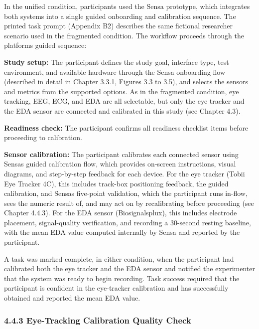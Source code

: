 \documentclass[
]{article}
\begin{document}
In the unified condition, participants used the Sensa prototype, which integrates both systems into a single guided onboarding and calibration sequence. The printed task prompt (Appendix B2) describes the same fictional researcher scenario used in the fragmented condition. The workflow proceeds through the platform\textquotesingle s guided sequence:

\textbf{Study setup:} The participant defines the study goal, interface type, test environment, and available hardware through the Sensa onboarding flow (described in detail in Chapter 3.3.1, Figures 3.3 to 3.5), and selects the sensors and metrics from the supported options. As in the fragmented condition, eye tracking, EEG, ECG, and EDA are all selectable, but only the eye tracker and the EDA sensor are connected and calibrated in this study (see Chapter 4.3).

\textbf{Readiness check:} The participant confirms all readiness checklist items before proceeding to calibration.

\textbf{Sensor calibration:} The participant calibrates each connected sensor using Sensa\textquotesingle s guided calibration flow, which provides on-screen instructions, visual diagrams, and step-by-step feedback for each device. For the eye tracker (Tobii Eye Tracker 4C), this includes track-box positioning feedback, the guided calibration, and Sensa\textquotesingle s five-point validation, which the participant runs in-flow, sees the numeric result of, and may act on by recalibrating before proceeding (see Chapter 4.4.3). For the EDA sensor (Biosignalsplux), this includes electrode placement, signal-quality verification, and recording a 30-second resting baseline, with the mean EDA value computed internally by Sensa and reported by the participant.

A task was marked complete, in either condition, when the participant had calibrated both the eye tracker and the EDA sensor and notified the experimenter that the system was ready to begin recording. Task success required that the participant is confident in the eye-tracker calibration and has successfully obtained and reported the mean EDA value.

\hypertarget{eye-tracking-calibration-quality-check}{%
\subsubsection{4.4.3 Eye-Tracking Calibration Quality Check}\label{eye-tracking-calibration-quality-check}}
\end{document}
